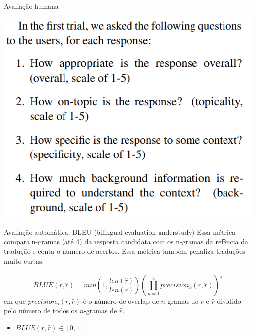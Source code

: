 \documentclass[10pt]{beamer}
\begin{document}
\begin{frame}{Avaliação humana \cite{Lowe:2016}}
\begin{center}
\includegraphics[scale=0.4]{images/exemploEval1.png}
\end{center}
\end{frame}




\begin{frame}{Avaliação automática: BLEU (bilingual evaluation understudy) \cite{Papineni2001}}
Essa métrica compara n-gramas (até 4) da resposta candidata com os n-gramas da refência da tradução e conta o numero de acertos. Essa métrica também penaliza traduções muito curtas:

\begin{equation*}
BLUE(r, \hat{r}) = min \left(1, \frac{len(\hat{r})}{len(r)} \right) \left(\prod_{n=1}^{4} precision_{n}(r, \hat{r}) \right)^{\frac{1}{4}}
\end{equation*}
em que $ precision_{n}(r, \hat{r})$ é o número de overlap de $n$ gramas de $r$ e $\hat{r}$ dividido pelo número de todos os $n$-gramas de $\hat{r}$. 

\begin{itemize}
\item $BLUE(r, \hat{r}) \in [0,1]$
\end{itemize}

\end{frame}
\end{document}
